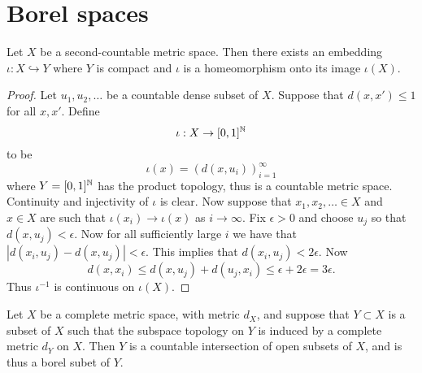 \documentclass[twoside, a4paper, 10pt]{amsart}
\begin{document}
\section{Borel spaces}

\begin{lemma} Let $X$ be a second-countable metric space. Then there exists an embedding $\iota:X \hookrightarrow Y$ where $Y$ is compact and $\iota$ is a homeomorphism onto its image $\iota(X)$.

\end{lemma}

\begin{proof} Let $u_1,u_2,\ldots $ be a countable dense subset of $X$. Suppose that $d(x,x')\leq 1$ for all $x,x'$. Define $$\iota:X \to [0,1]^{\mathbb{N}}$$ to be $$\iota(x) = (d(x,u_i))_{i=1}^{\infty}$$ where $Y=[0,1]^{\mathbb{N}}$ has the product topology, thus is a countable metric space. Continuity and injectivity of $\iota$ is clear. Now suppose that $x_1,x_2,\ldots \in X$ and $x\in X$ are such that $\iota(x_i) \to \iota(x)$ as $i \to \infty$. Fix $\epsilon>0$ and choose $u_j$ so that $d(x,u_j)<\epsilon$. Now for all sufficiently large $i$ we have that $|d(x_i, u_j) - d(x,u_j)| < \epsilon$. This implies that $d(x_i,u_j) < 2\epsilon$. Now $$d(x,x_i) \leq d(x,u_j) + d(u_j,x_i) \leq \epsilon + 2\epsilon  = 3\epsilon.$$ Thus $\iota^{-1}$ is continuous on $\iota(X)$. \end{proof}

\begin{lemma} Let $X$ be a complete metric space, with metric $d_X$, and suppose that $Y \subset X$ is a subset of $X$ such that the subspace topology on $Y$ is induced by a complete metric $d_Y$ on $X$. Then $Y$ is a countable intersection of open subsets of $X$, and is thus a borel subet of $Y$.

\end{lemma}
\end{document}

